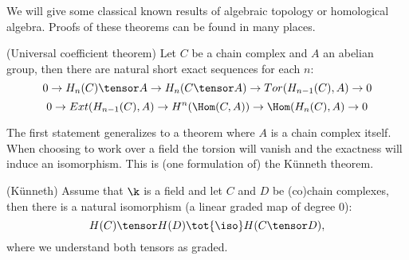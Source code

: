We will give some classical known results of algebraic topology or homological algebra. Proofs of these theorems can be found in many places. 

\begin{theorem}
	(Universal coefficient theorem) Let $C$ be a chain complex and $A$ an abelian group, then there are natural short exact sequences for each $n$:
	$$ 0 \to H_n(C) \tensor A \to H_n(C \tensor A) \to Tor(H_{n-1}(C), A) \to 0 $$
	$$ 0 \to Ext(H_{n-1}(C), A) \to H^n(\Hom(C, A)) \to \Hom(H_n(C), A) \to 0 $$
\end{theorem}

The first statement generalizes to a theorem where $A$ is a chain complex itself. When choosing to work over a field the torsion will vanish and the exactness will induce an isomorphism. This is (one formulation of) the Künneth theorem.

\begin{theorem}
	(Künneth) Assume that $\k$ is a field and let $C$ and $D$ be (co)chain complexes, then there is a natural isomorphism (a linear graded map of degree $0$):
	$$ H(C) \tensor H(D) \tot{\iso} H(C \tensor D), $$
	where we understand both tensors as graded.
\end{theorem}

